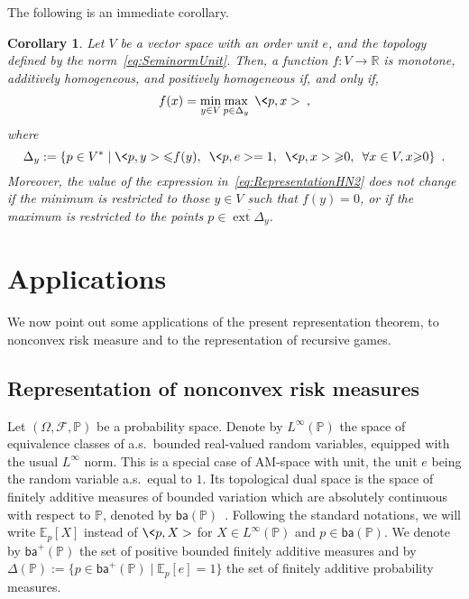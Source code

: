 \documentclass[a4paper,11pt]{amsart}
\newtheorem{corollary}[theorem]{Corollary}
\theoremstyle{definition}
\theoremstyle{remark}
\begin{document}
The following is an immediate corollary. 
\begin{corollary}
  \label{coro:RepresentationMAH2}
  Let $V$ be a vector space with an order unit ${e}$, and the topology defined by the norm~\eqref{eq:SeminormUnit}. 
  Then, a function $f:V \to {\mathbb{R}}$ is monotone, additively homogeneous, and positively homogeneous if, and only if,
  \begin{align}
    f(x) = \min_{y \in V} \max_{p \in \Delta_y} \; \<p,x> \enspace ,
    \label{eq:RepresentationHN2}
  \end{align}
  where 
  \[
    \Delta_y := \{p \in V^* \mid \<p,y> {\leqslant} f(y), \enspace \<p,{e}>=1, \enspace \<p,x> {\geqslant} 0, \enspace \forall x \in V, x {\geqslant} 0 \} \enspace .
  \]
  Moreover, the value of the expression in~\eqref{eq:RepresentationHN2} does not change if the minimum is restricted to those $y \in V$ such that $f(y)=0$, or if the maximum is restricted to the points $p \in {\overline{{\operatorname{ext}{\Delta_y}}}}$.
\end{corollary}

\section{Applications}
We now point out some applications of the present representation theorem,
to nonconvex risk measure and to the representation of recursive games. 
\subsection{Representation of nonconvex risk measures}
Let $(\Omega, \mathcal{F}, {\mathbb{P}})$ be a probability space.
Denote by $L^\infty({\mathbb{P}})$ the space of equivalence classes of a.s.\ bounded real-valued random variables, equipped with the usual $L^\infty$ norm.
This is a special case of AM-space with unit, the unit ${e}$ being the random variable a.s.\ equal to $1$.
Its topological dual space is the space of finitely additive measures of bounded variation which are absolutely continuous with respect to ${\mathbb{P}}$, denoted by ${\mathsf{ba}}({\mathbb{P}})$~\cite[Theorem IV.8.16]{DS88}.
Following the standard notations, we will write ${\mathbb{E}}_p[X]$ instead of $\<p,X>$ for $X \in L^\infty({\mathbb{P}})$ and $p \in {\mathsf{ba}}({\mathbb{P}})$.
We denote by ${\mathsf{ba}}^+({\mathbb{P}})$ the set of positive bounded finitely additive measures and by $\Delta({\mathbb{P}}) := \{ p \in {\mathsf{ba}}^+({\mathbb{P}}) \mid {\mathbb{E}}_p[{e}]=1 \}$ the set of finitely additive probability measures.
\end{document}
